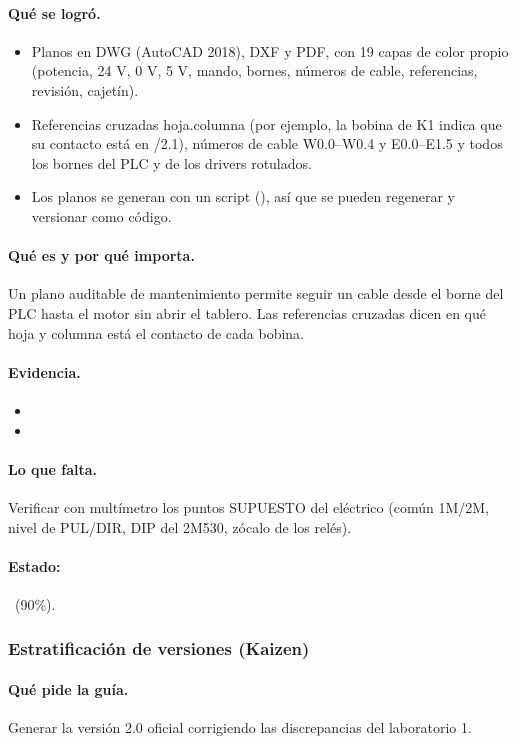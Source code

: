 \documentclass[a4paper,11pt]{article}
\begin{document}
\paragraph{Qué se logró.}
\begin{itemize}
\item Planos en DWG (AutoCAD 2018), DXF y PDF, con 19 capas de color propio (potencia, 24 V, 0 V, 5 V, mando, bornes, números de cable, referencias, revisión, cajetín).
\item Referencias cruzadas hoja.columna (por ejemplo, la bobina de K1 indica que su contacto está en /2.1), números de cable W0.0–W0.4 y E0.0–E1.5 y todos los bornes del PLC y de los drivers rotulados.
\item Los planos se generan con un script (), así que se pueden regenerar y versionar como código.
\end{itemize}
\paragraph{Qué es y por qué importa.} Un plano auditable de mantenimiento permite seguir un cable desde el borne del PLC hasta el motor sin abrir el tablero. Las referencias cruzadas dicen en qué hoja y columna está el contacto de cada bobina.
\paragraph{Evidencia.}
\begin{itemize}\small
\item {}
\item {}
\end{itemize}
\paragraph{Lo que falta.} Verificar con multímetro los puntos SUPUESTO del eléctrico (común 1M/2M, nivel de PUL/DIR, DIP del 2M530, zócalo de los relés).
\paragraph{Estado:} \parcial~(90\%).
\subsubsection{Estratificación de versiones (Kaizen)}
\paragraph{Qué pide la guía.} Generar la versión 2.0 oficial corrigiendo las discrepancias del laboratorio 1.
\end{document}
